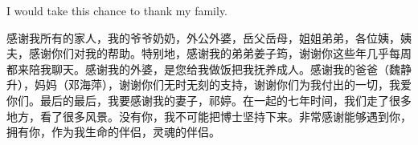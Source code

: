 I would take this chance to thank my family. 
\begin{CJK*}{UTF8}{gbsn}
感谢我所有的家人，我的爷爷奶奶，外公外婆，岳父岳母，姐姐弟弟，各位姨，姨夫，感谢你们对我的帮助。特别地，感谢我的弟弟姜子筠，谢谢你这些年几乎每周都来陪我聊天。感谢我的外婆，是您给我做饭把我抚养成人。感谢我的爸爸（魏静升），妈妈（邓海萍），谢谢你们无时无刻的支持，谢谢你们为我付出的一切，我爱你们。最后的最后，我要感谢我的妻子，祁婷。在一起的七年时间，我们走了很多地方，看了很多风景。没有你，我不可能把博士坚持下来。非常感谢能够遇到你，拥有你，作为我生命的伴侣，灵魂的伴侣。
\end{CJK*} 


